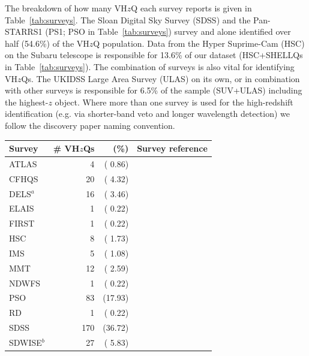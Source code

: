 \documentclass[usenatbib]{mnras}
\begin{document}
The breakdown of how many VH$z$Q each survey reports is given in
Table~\ref{tab:surveys}. The Sloan Digital Sky Survey (SDSS) and the
Pan-STARRS1 (PS1; PSO in Table~\ref{tab:surveys}) survey and alone
identified over half (54.6\%) of the VH$z$Q population. Data from the
Hyper Suprime-Cam (HSC) on the Subaru telescope is responsible for
13.6\% of our dataset (HSC+SHELLQs in Table~\ref{tab:surveys}). The
combination of surveys is also vital for identifying VH$z$Qs. The
UKIDSS Large Area Survey (ULAS) on its own, or in combination with
other surveys is responsible for 6.5\% of the sample (SUV+ULAS)
including the highest-$z$ object. Where more than one survey is used
for the high-redshift identification (e.g. via shorter-band veto and
longer wavelength detection) we follow the discovery paper naming
convention.


\begin{table}
\begin{tabular}{l r r l}
\hline  \hline
Survey              & \# VH$z$Qs & (\%) & Survey reference  \\
\hline  
  ATLAS             &     4    &   ( 0.86)    &  \citet{Shanks2015} \\
  CFHQS            &   20    &   ( 4.32)    &  \citet{Willott2007} \\
  DELS$^{a}$       &   16    &   ( 3.46)    &  \citet{Dey2018} \\
  ELAIS              &     1    &   ( 0.22)    &  \citet{Vaisanen2000} \\
  FIRST              &     1    &   ( 0.22)    &  \citet{Becker1995} \\
  HSC                 &    8    &   ( 1.73)    & \citet{Miyazaki2018} \\
  IMS                 &     5    &   ( 1.08)     &  \citet{Kim2015} \\
  MMT               &   12    &   ( 2.59)     &  \citet{McGreer2013} \\
  NDWFS           &     1    &   ( 0.22)    &  \citet{JD1999} \\
  PSO                 &   83   &   (17.93)   &   \citet{Kaiser2002, Kaiser2010} \\
  RD                   &     1   &   ( 0.22)    &  \citet{Mahabal2005} \\
  SDSS                &  170  &    (36.72)    & \citet{EDR} \\
 SDWISE$^{b}$    &   27    &  ( 5.83)    &   \citet{WangF2016} \\

\end{tabular}
\end{table}
\end{document}

